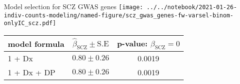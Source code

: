 \documentclass[usenames,dvipsnames]{beamer}
\begin{document}
%

\begin{frame}{Model selection for SCZ GWAS genes}
\small
\texttt{[image: ../../notebook/2021-01-26-indiv-counts-modeling/named-figure/scz\_gwas\_genes-fw-varsel-binom-onlyIC\_scz.pdf]}

\begin{center}
\tiny
\begin{tabular}{l|cc}
model formula & \(\hat{\beta}_\mathrm{SCZ} \pm \mathrm{S.E}\) & p-value: \(\beta_\mathrm{SCZ} = 0\) \\
\hline
1 + Dx & \(0.80 \pm 0.26\) & 0.0019 \\
1 + Dx + DP & \(0.80 \pm 0.26\) & 0.0019 \\
\end{tabular}
\end{center}
\end{frame}
\end{document}
